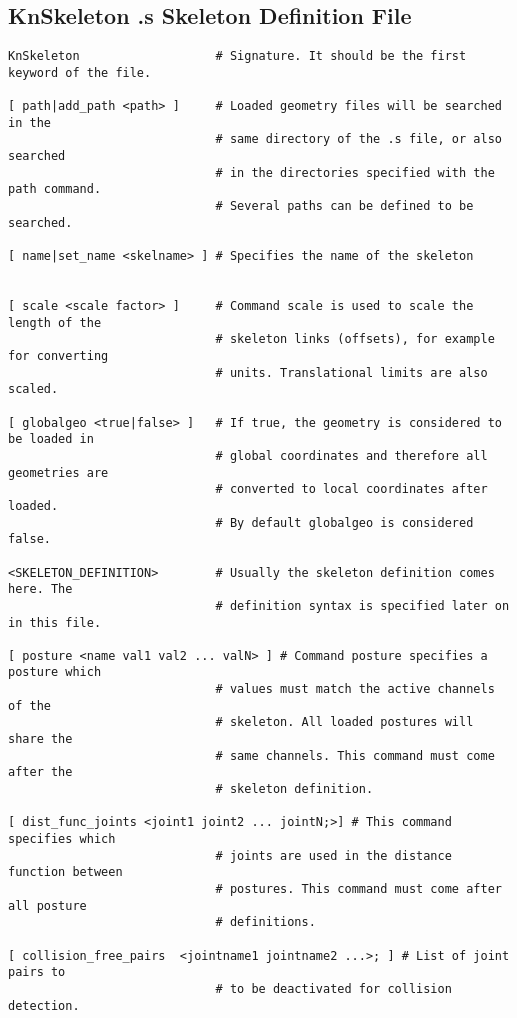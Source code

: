 \subsection{KnSkeleton .s Skeleton Definition File}

\begin{lstlisting}[title={}]
KnSkeleton                   # Signature. It should be the first keyword of the file.

[ path|add_path <path> ]     # Loaded geometry files will be searched in the 
                             # same directory of the .s file, or also searched
                             # in the directories specified with the path command.
                             # Several paths can be defined to be searched.

[ name|set_name <skelname> ] # Specifies the name of the skeleton


[ scale <scale factor> ]     # Command scale is used to scale the length of the
                             # skeleton links (offsets), for example for converting
                             # units. Translational limits are also scaled.

[ globalgeo <true|false> ]   # If true, the geometry is considered to be loaded in
                             # global coordinates and therefore all geometries are
                             # converted to local coordinates after loaded.
                             # By default globalgeo is considered false.

<SKELETON_DEFINITION>        # Usually the skeleton definition comes here. The 
                             # definition syntax is specified later on in this file.

[ posture <name val1 val2 ... valN> ] # Command posture specifies a posture which
                             # values must match the active channels of the
                             # skeleton. All loaded postures will share the
                             # same channels. This command must come after the 
                             # skeleton definition.

[ dist_func_joints <joint1 joint2 ... jointN;>] # This command specifies which 
                             # joints are used in the distance function between
                             # postures. This command must come after all posture
                             # definitions.

[ collision_free_pairs  <jointname1 jointname2 ...>; ] # List of joint pairs to
                             # to be deactivated for collision detection.


\end{lstlisting}
